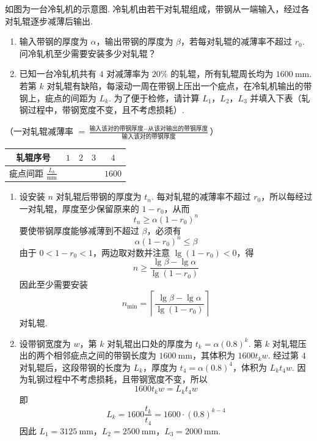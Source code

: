 \begin{problem}
如图为一台冷轧机的示意图. 冷轧机由若干对轧辊组成，带钢从一端输入，经过各对轧辊逐步减薄后输出.

\begin{enumerate}
\item 输入带钢的厚度为 \(\alpha\)，输出带钢的厚度为 \(\beta\)，若每对轧辊的减薄率不超过 \(r_0\). 问冷轧机至少需要安装多少对轧辊？
\item 已知一台冷轧机共有 \(4\) 对减薄率为 \(20\%\) 的轧辊，所有轧辊周长均为 \(1600\mathrm{~mm}\). 若第 \(k\) 对轧辊有缺陷，每滚动一周在带钢上压出一个疵点，在冷轧机输出的带钢上，疵点的间距为 \(L_k\). 为了便于检修，请计算 \(L_1\)，\(L_2\)，\(L_3\) 并填入下表（轧钢过程中，带钢宽度不变，且不考虑损耗）.
\end{enumerate}

（一对轧辊减薄率 \(=\frac{\text{输入该对的带钢厚度}-\text{从该对输出的带钢厚度}}{\text{输入该对的带钢厚度}}\)）

\begin{center}
\begin{tabular}{|c|c|c|c|c|}
\hline
轧辊序号 & \(1\) & \(2\) & \(3\) & \(4\) \\
\hline
疵点间距 \(\frac{L_k}{\mathrm{mm}}\) &  &  &  & \(1600\) \\
\hline
\end{tabular}
\end{center}

\end{problem}

\begin{solution}
\begin{enumerate}
\item 设安装 \(n\) 对轧辊后带钢的厚度为 \(t_n\). 每对轧辊的减薄率不超过 \(r_0\)，所以每经过一对轧辊，厚度至少保留原来的 \(1-r_0\)，从而
\[
t_n\geqslant\alpha(1-r_0)^n
\]
要使带钢厚度能够减薄到不超过 \(\beta\)，必须有
\[
\alpha(1-r_0)^n\leqslant\beta
\]
由于 \(0<1-r_0<1\)，两边取对数并注意 \(\lg(1-r_0)<0\)，得
\[
n\geqslant\frac{\lg\beta-\lg\alpha}{\lg(1-r_0)}
\]
因此至少需要安装
\[
n_{\min}=\left\lceil\frac{\lg\beta-\lg\alpha}{\lg(1-r_0)}\right\rceil
\]
对轧辊.

\item 设带钢宽度为 \(w\)，第 \(k\) 对轧辊出口处的厚度为 \(t_k=\alpha(0.8)^k\). 第 \(k\) 对轧辊压出的两个相邻疵点之间的带钢长度为 \(1600\mathrm{~mm}\)，其体积为 \(1600t_kw\). 经过第 \(4\) 对轧辊后，这段带钢的长度为 \(L_k\)，厚度为 \(t_4=\alpha(0.8)^4\)，体积为 \(L_kt_4w\). 因为轧钢过程中不考虑损耗，且带钢宽度不变，所以
\[
1600t_kw=L_kt_4w
\]
即
\[
L_k=1600\frac{t_k}{t_4}=1600\cdot(0.8)^{k-4}
\]
因此 \(L_1=3125\mathrm{~mm}\)，\(L_2=2500\mathrm{~mm}\)，\(L_3=2000\mathrm{~mm}\).
\end{enumerate}
\end{solution}


